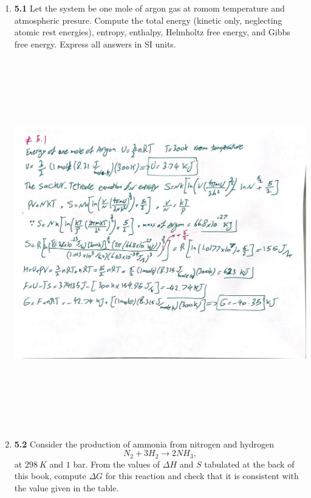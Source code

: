 \documentclass[fleqn]{article}
\begin{document}
  \begin{enumerate}
    \item \textbf{5.1} Let the system be one mole of argon gas at romom temperature and atmospheric presure. Compute
    the total energy (kinetic only, neglecting atomic rest energies), entropy, enthalpy, Helmholtz free energy, and 
    Gibbs free energy. Express all answers in SI units.

    \begin{center}
      \includegraphics[height=16cm, width=17cm]{51.JPG}
    \end{center}

    \pagebreak

    \item \textbf{5.2} Consider the production of ammonia from nitrogen and hydrogen
    $$
      N_2+3H_2 \longrightarrow 2NH_3,
    $$
    at $298 ~ K$ and $1$ bar. From the values of $\Delta H$ and $S$ tabulated at the back of this book, compute $\Delta G$
    for this reaction and check that it is consistent with the value given in the table.


\end{enumerate}
\end{document}
